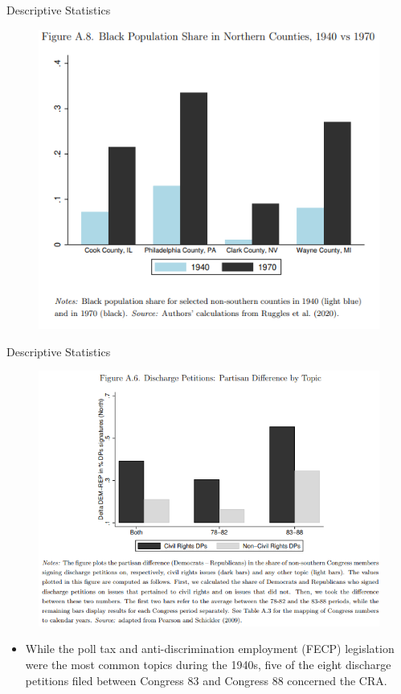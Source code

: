 \documentclass[dvipdfmx,11pt]{beamer}
\begin{document}
\begin{frame}{Descriptive Statistics}
  \begin{figure}
    \centering
    \includegraphics[scale = .5]{fig_tab/os20220708/FA8.png}
  \end{figure}
\end{frame}

\begin{frame}{Descriptive Statistics}
  \begin{figure}
    \centering
    \includegraphics[scale = .45]{fig_tab/os20220708/FA6.png}
  \end{figure}
  \begin{itemize}
    \footnotesize
    \item While the poll tax and anti-discrimination employment (FECP) legislation were the most common topics during the 1940s, five of the eight discharge petitions filed between Congress 83 and Congress 88 concerned the CRA.
  \end{itemize}
\end{frame}
\end{document}
